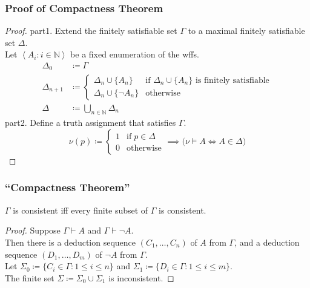 \documentclass[UTF8,11pt,colorlinks,compress,openany]{beamer}%
\begin{document}
\begin{frame}\frametitle{Proof of Compactness Theorem}
	\begin{proof}
		part1. Extend the finitely satisfiable
		set $\Gamma$ to a maximal finitely satisfiable set $\Delta$.\\
		Let $\left\langle A_i: i\in\mathbb{N}\right\rangle$ be a fixed enumeration of the wffs.
		\begin{align*}
		\Delta_0&\coloneqq \Gamma\\
		\Delta_{n+1}&\coloneqq 
		\begin{cases}
		\Delta_n\cup\{A_n\} &\text{if $\Delta_n\cup\{A_n\}$ is finitely satisfiable}\\
		\Delta_n\cup\{\neg A_n\} &\text{otherwise}
		\end{cases}\\
		\Delta&\coloneqq \bigcup\limits_{n\in\mathbb{N}}\Delta_n
		\end{align*}
		part2. Define a truth assignment that satisfies $\Gamma$.
		\[\nu(p)\coloneqq 
		\begin{cases}
		1 &\text{if}\; p\in\Delta\\
		0 &\text{otherwise}
		\end{cases}\implies\big(\nu\vDash A\iff A\in\Delta\big)\]
	\end{proof}
\end{frame}

\begin{frame}\frametitle{``Compactness Theorem''}
	\begin{theorem}
		$\Gamma$ is consistent iff every finite subset of $\Gamma$ is consistent.
	\end{theorem}
	\begin{proof}
		Suppose $\Gamma\vdash A$ and $\Gamma\vdash\neg A$.\\
		Then there is a deduction sequence $(C_1,\dots,C_n)$ of $A$ from $\Gamma$, and a deduction sequence $(D_1,\dots,D_m)$ of $\neg A$ from $\Gamma$.\\
		Let $\Sigma_0\coloneqq \{C_i\in\Gamma: 1\leq i\leq n\}$ and $\Sigma_1\coloneqq \{D_i\in\Gamma: 1\leq i\leq m\}$.\\
		The finite set $\Sigma\coloneqq \Sigma_0\cup\Sigma_1$ is inconsistent.
	\end{proof}
\end{frame}
\end{document}
